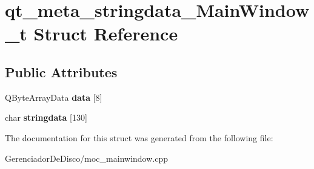 \hypertarget{structqt__meta__stringdata__MainWindow__t}{}\section{qt\+\_\+meta\+\_\+stringdata\+\_\+\+Main\+Window\+\_\+t Struct Reference}
\label{structqt__meta__stringdata__MainWindow__t}
\subsection*{Public Attributes}
\begin{DoxyCompactItemize}
\item 
\hypertarget{structqt__meta__stringdata__MainWindow__t_ae8888f3a82b4bd7597ba5dad592aeec6}{}Q\+Byte\+Array\+Data {\bfseries data} \mbox{[}8\mbox{]}\label{structqt__meta__stringdata__MainWindow__t_ae8888f3a82b4bd7597ba5dad592aeec6}

\item 
\hypertarget{structqt__meta__stringdata__MainWindow__t_a36f09c6ee58fefb768d55e0f8051d219}{}char {\bfseries stringdata} \mbox{[}130\mbox{]}\label{structqt__meta__stringdata__MainWindow__t_a36f09c6ee58fefb768d55e0f8051d219}

\end{DoxyCompactItemize}


The documentation for this struct was generated from the following file\+:\begin{DoxyCompactItemize}
\item 
Gerenciador\+De\+Disco/moc\+\_\+mainwindow.\+cpp\end{DoxyCompactItemize}
